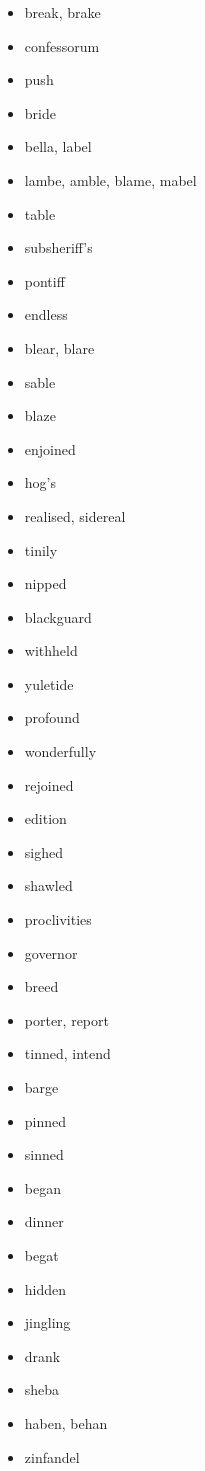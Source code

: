 \documentclass{article}
\begin{document}
\begin{itemize}
    \item break, brake
    \item confessorum
    \item push
    \item bride
    \item bella, label
    \item lambe, amble, blame, mabel
    \item table
    \item subsheriff's
    \item pontiff
    \item endless
    \item blear, blare
    \item sable
    \item blaze
    \item enjoined
    \item hog's
    \item realised, sidereal
    \item tinily
    \item nipped
    \item blackguard
    \item withheld
    \item yuletide
    \item profound
    \item wonderfully
    \item rejoined
    \item edition
    \item sighed
    \item shawled
    \item proclivities
    \item governor
    \item breed
    \item porter, report
    \item tinned, intend
    \item barge
    \item pinned
    \item sinned
    \item began
    \item dinner
    \item begat
    \item hidden
    \item jingling
    \item drank
    \item sheba
    \item haben, behan
    \item zinfandel

\end{itemize}
\end{document}
